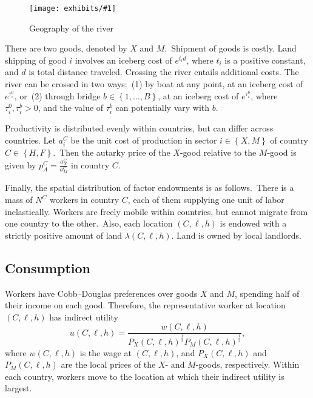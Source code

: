 \documentclass[12pt]{article}
\newcommand{\dofigure}[2]{\begin{figure}[h!]
\center %
\texttt{[image: exhibits/\#1]}
  \caption{#2\label{fig:#1}}
\end{figure}}
\begin{document}
\dofigure{figurem1}{Geography of the river}

There are two goods, denoted by $X$ and $M$.\ Shipment of goods is costly.
Land shipping of good $i$ involves an iceberg cost of $e^{t_{i}d}$, where $%
t_{i}$ is a positive constant, and $d$ is total distance traveled. Crossing
the river entails additional costs. The river can be crossed in two ways:\
(1) by boat at any point, at an iceberg cost of $e^{\tau _{i}^{0}}$, or\ (2)
through bridge $b\in \left \{ 1,\ldots ,B\right \} $, at an iceberg cost of $%
e^{\tau _{i}^{b}}$, where $\tau _{i}^{0},\tau _{i}^{b}>0$, and the value of $%
\tau _{i}^{b}$ can potentially vary with $b$.

Productivity is distributed evenly within countries, but can differ across
countries. Let $a_{i}^{C}$ be the unit cost of production in sector $i\in
\left \{ X,M\right \} $ of country $C\in \left \{ H,F\right \} $.\ Then the
autarky price of the $X$-good relative to the $M$-good is given by $%
p_{A}^{C}=\frac{a_{X}^{C}}{a_{M}^{C}}$ in country $C$.

Finally, the spatial distribution of factor endowments is as follows.\ There
is a mass of $N^{C}$ workers in country $C$, each of them supplying one unit
of labor inelastically. Workers are freely mobile within countries, but
cannot migrate from one country to the other.\ Also, each location $\left(
C,\ell ,h\right) $ is endowed with a strictly positive amount of land $%
\lambda \left( C,\ell ,h\right) $. Land is owned by local landlords.

\subsection{Consumption}

Workers have Cobb--Douglas preferences over goods $X$ and $M$, spending half
of their income on each good. Therefore, the representative worker at
location $\left( C,\ell ,h\right) $ has indirect utility%
\begin{equation}
u\left( C,\ell ,h\right) =\frac{w\left( C,\ell ,h\right) }{P_{X}\left(
C,\ell ,h\right) ^{\frac{1}{2}}P_{M}\left( C,\ell ,h\right) ^{\frac{1}{2}}},
\end{equation}%
where $w\left( C,\ell ,h\right) $ is the wage at $\left( C,\ell ,h\right) $,
and $P_{X}\left( C,\ell ,h\right) $ and $P_{M}\left( C,\ell ,h\right) $ are
the local prices of the $X$- and $M$-goods, respectively. Within each
country, workers move to the location at which their indirect utility is
largest.
\end{document}
